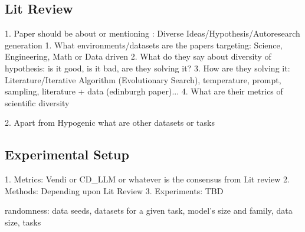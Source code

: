 \subsection{Lit Review}
1. Paper should be about or mentioning : Diverse Ideas/Hypothesis/Autoresearch generation
    1. What environments/datasets are the papers targeting: Science, Engineering, Math or Data driven
    2. What do they say about diversity of hypothesis: is it good, is it bad, are they solving it?
    3. How are they solving it: Literature/Iterative Algorithm (Evolutionary Search), temperature, prompt, sampling, literature + data (edinburgh paper)...
    4. What are their metrics of scientific diversity

2. Apart from Hypogenic what are other datasets or tasks

\subsection{Experimental Setup}
1. Metrics: Vendi or CD\_LLM or whatever is the consensus from Lit review
2. Methods: Depending upon Lit Review
3. Experiments: TBD

randomness: data seeds, datasets for a given task, model's size and family, data size, tasks

